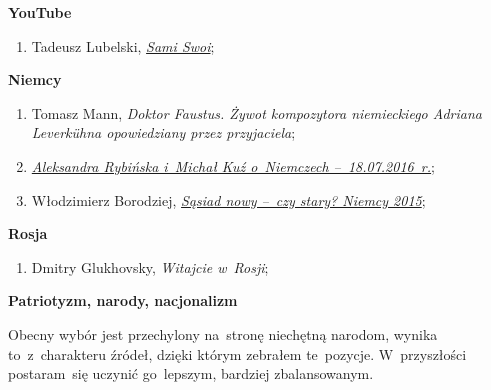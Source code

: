 \documentclass[a4paper,11pt]{article}
\newcommand{\spaceOne}{1.5em}
\newcommand{\tb}{\textbf}
\newcommand{\Field}[1]{ \begin{center} {\Large \tb{#1} } \end{center} }
\newcommand{\Work}[1]{ \begin{center} {\large \tb{#1}} \end{center} }
\begin{document}
\vspace{\spaceOne}



\Work{YouTube}

\begin{enumerate}
\item Tadeusz Lubelski,
  \href{https://www.youtube.com/watch?v=my8nccykDWQ}{\emph{Sami
      Swoi}};
\end{enumerate}

\vspace{\spaceOne}



\Field{Niemcy}



\begin{enumerate}
\item Tomasz Mann, \emph{Doktor Faustus. Żywot kompozytora
    niemieckiego Adriana Leverk\"{u}hna opowiedziany przez
    przyjaciela};
\item
  \href{https://www.youtube.com/watch?v=moHu6fGkOwA}{\emph{Aleksandra
      Rybińska i~Michał Kuź o~Niemczech --~18.07.2016~r.}};
\item Włodzimierz Borodziej,
  \href{https://www.youtube.com/watch?v=yQ0gfxVCN00}{\emph{Sąsiad nowy
      --~czy stary? Niemcy 2015}};
\end{enumerate}

\vspace{\spaceOne}



\Field{Rosja}



\begin{enumerate}
\item Dmitry Glukhovsky, \emph{Witajcie w~Rosji};
\end{enumerate}

\vspace{\spaceOne}



\Work{Patriotyzm, narody, nacjonalizm}



\begin{displayquote}
  Obecny wybór jest przechylony na~stronę niechętną narodom, wynika
  to~z~charakteru źródeł, dzięki którym zebrałem te~pozycje.
  W~przyszłości postaram~się uczynić go~lepszym, bardziej
  zbalansowanym.
\end{displayquote}
\end{document}
